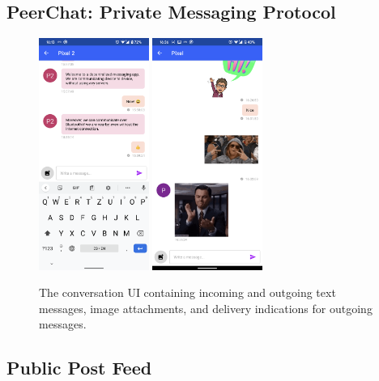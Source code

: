 \subsection{PeerChat: Private Messaging Protocol}

\begin{figure}
    \centering
    \includegraphics[width=0.32\textwidth]{screens/superapp/conversation_text}
    \includegraphics[width=0.32\textwidth]{screens/superapp/conversation}
    \caption{The conversation UI containing incoming and outgoing text messages, image attachments, and delivery indications for outgoing messages.}
    \label{manyverse}
\end{figure}

\subsection{Public Post Feed}

